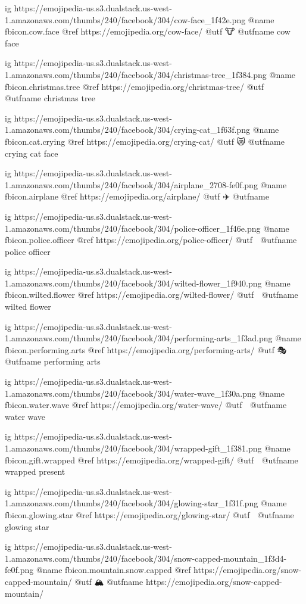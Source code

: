   ig https://emojipedia-us.s3.dualstack.us-west-1.amazonaws.com/thumbs/240/facebook/304/cow-face_1f42e.png
  @name fbicon.cow.face
  @ref https://emojipedia.org/cow-face/
  @utf 🐮
  @utfname cow face

  ig https://emojipedia-us.s3.dualstack.us-west-1.amazonaws.com/thumbs/240/facebook/304/christmas-tree_1f384.png
  @name fbicon.christmas.tree
  @ref https://emojipedia.org/christmas-tree/
  @utf 🎄
  @utfname christmas tree

  ig https://emojipedia-us.s3.dualstack.us-west-1.amazonaws.com/thumbs/240/facebook/304/crying-cat_1f63f.png
  @name fbicon.cat.crying
  @ref https://emojipedia.org/crying-cat/
  @utf 😿
  @utfname crying cat face

  ig https://emojipedia-us.s3.dualstack.us-west-1.amazonaws.com/thumbs/240/facebook/304/airplane_2708-fe0f.png
  @name fbicon.airplane
  @ref https://emojipedia.org/airplane/
  @utf ✈️
  @utfname

  ig https://emojipedia-us.s3.dualstack.us-west-1.amazonaws.com/thumbs/240/facebook/304/police-officer_1f46e.png
  @name fbicon.police.officer
  @ref https://emojipedia.org/police-officer/
  @utf 👮
  @utfname police officer

  ig https://emojipedia-us.s3.dualstack.us-west-1.amazonaws.com/thumbs/240/facebook/304/wilted-flower_1f940.png
  @name fbicon.wilted.flower
  @ref https://emojipedia.org/wilted-flower/
  @utf 🥀
  @utfname wilted flower

  ig https://emojipedia-us.s3.dualstack.us-west-1.amazonaws.com/thumbs/240/facebook/304/performing-arts_1f3ad.png
  @name fbicon.performing.arts
  @ref https://emojipedia.org/performing-arts/
  @utf 🎭
  @utfname performing arts

  ig https://emojipedia-us.s3.dualstack.us-west-1.amazonaws.com/thumbs/240/facebook/304/water-wave_1f30a.png
  @name fbicon.water.wave
  @ref https://emojipedia.org/water-wave/
  @utf 🌊
  @utfname water wave

  ig https://emojipedia-us.s3.dualstack.us-west-1.amazonaws.com/thumbs/240/facebook/304/wrapped-gift_1f381.png
  @name fbicon.gift.wrapped
  @ref https://emojipedia.org/wrapped-gift/
  @utf 🎁
  @utfname wrapped present

  ig https://emojipedia-us.s3.dualstack.us-west-1.amazonaws.com/thumbs/240/facebook/304/glowing-star_1f31f.png
  @name fbicon.glowing.star
  @ref https://emojipedia.org/glowing-star/
  @utf 🌟
  @utfname glowing star

  ig https://emojipedia-us.s3.dualstack.us-west-1.amazonaws.com/thumbs/240/facebook/304/snow-capped-mountain_1f3d4-fe0f.png
  @name fbicon.mountain.snow.capped
  @ref https://emojipedia.org/snow-capped-mountain/
  @utf 🏔
  @utfname https://emojipedia.org/snow-capped-mountain/


